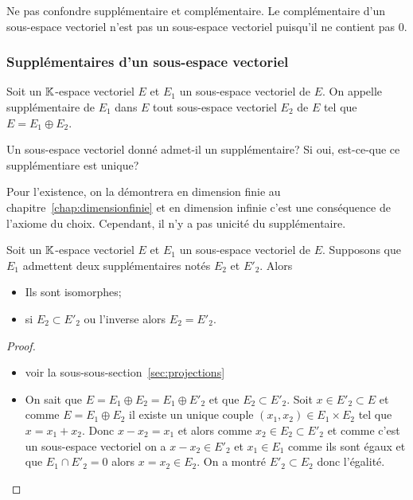 Ne pas confondre supplémentaire et complémentaire. Le complémentaire d'un sous-espace vectoriel n'est pas un sous-espace vectoriel puisqu'il ne contient pas $0$.

\subsubsection{Supplémentaires d'un sous-espace vectoriel}

\begin{defdef}
  Soit un $\mathbb{K}$-espace vectoriel $E$ et $E_1$ un sous-espace vectoriel de $E$. On appelle supplémentaire de $E_1$ dans $E$ tout sous-espace vectoriel $E_2$ de $E$ tel que $E= E_1 \oplus E_2$.
\end{defdef}

Un sous-espace vectoriel donné admet-il un supplémentaire? Si oui, est-ce-que ce supplémentiare est unique?

Pour l'existence, on la démontrera en dimension finie au chapitre~\ref{chap:dimensionfinie} et en dimension infinie c'est une conséquence de l'axiome du choix. Cependant, il n'y a pas unicité du supplémentaire.

\begin{prop}\label{prop:deuxsuppiso}
  Soit un $\mathbb{K}$-espace vectoriel $E$ et $E_1$ un sous-espace vectoriel de $E$. Supposons que $E_1$ admettent deux supplémentaires notés $E_2$ et $E'_2$. Alors
  \begin{itemize}
  \item Ils sont isomorphes;
  \item si $E_2 \subset E'_2$ ou l'inverse alors $E_2=E'_2$.
  \end{itemize}
\end{prop}
\begin{proof}
  \begin{itemize}
  \item voir la sous-sous-section~\ref{sec:projections}
  \item On sait que $E=E_1 \oplus E_2=E_1 \oplus E'_2$ et que $E_2 \subset E'_2$. Soit $x \in E'_2 \subset E$ et comme $E=E_1 \oplus E_2$ il existe un unique couple $(x_1,x_2 ) \in E_1 \times E_2$ tel que $x=x_1+x_2$. Donc $x-x_2=x_1$ et alors comme $x_2 \in E_2 \subset E'_2$ et comme c'est un sous-espace vectoriel on a $x-x_2\in E'_2$  et $x_1 \in E_1$ comme ils sont égaux et que $E_1 \cap E'_2=0$  alors $x=x_2 \in E_2$. On a montré $E'_2 \subset E_2$ donc l'égalité.
  \end{itemize}
\end{proof}


